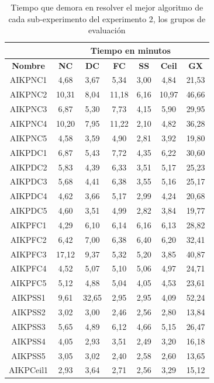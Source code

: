 \begin{table}[hbtp!]
\caption{Tiempo que demora en resolver el mejor algoritmo de cada sub-experimento del experimento 2, los grupos de evaluación}\label{tab:evol_vs_eval_tiempos_exp2}
\small
\centering
\begin{center}
\begin{tabular}{c|cccccc}
{\textbf{}} & \multicolumn{6}{c}{{\textbf{Tiempo en minutos}}} \\ \hline
{\textbf{Nombre}} & {\textbf{NC}} & {\textbf{DC}} & {\textbf{FC}} & {\textbf{SS}} & {\textbf{Ceil}} & {\textbf{GX}} \\ \hline
AIKPNC1 & 4,68 & 3,67 & 5,34 & 3,00 & 4,84 & 21,53 \\
AIKPNC2 & 10,31 & 8,04 & 11,18 & 6,16 & 10,97 & 46,66 \\
AIKPNC3 & 6,87 & 5,30 & 7,73 & 4,15 & 5,90 & 29,95 \\
AIKPNC4 & 10,20 & 7,95 & 11,22 & 2,10 & 4,82 & 36,28 \\
AIKPNC5 & 4,58 & 3,59 & 4,90 & 2,81 & 3,92 & 19,80 \\
AIKPDC1 & 6,87 & 5,43 & 7,72 & 4,35 & 6,22 & 30,60 \\
AIKPDC2 & 5,83 & 4,39 & 6,33 & 3,51 & 5,17 & 25,23 \\
AIKPDC3 & 5,68 & 4,41 & 6,38 & 3,55 & 5,16 & 25,17 \\
AIKPDC4 & 4,62 & 3,66 & 5,17 & 2,99 & 4,24 & 20,68 \\
AIKPDC5 & 4,60 & 3,51 & 4,99 & 2,82 & 3,84 & 19,77 \\
AIKPFC1 & 4,29 & 6,10 & 6,14 & 6,16 & 6,13 & 28,82 \\
AIKPFC2 & 6,42 & 7,00 & 6,38 & 6,40 & 6,20 & 32,41 \\
AIKPFC3 & 17,12 & 9,37 & 5,32 & 5,20 & 3,85 & 40,87 \\
AIKPFC4 & 4,52 & 5,07 & 5,10 & 5,06 & 4,97 & 24,71 \\
AIKPFC5 & 5,12 & 4,88 & 5,04 & 4,05 & 4,53 & 23,61 \\
AIKPSS1 & 9,61 & 32,65 & 2,95 & 2,95 & 4,09 & 52,24 \\
AIKPSS2 & 3,02 & 3,00 & 2,46 & 2,56 & 2,80 & 13,84 \\
AIKPSS3 & 5,65 & 4,89 & 6,12 & 4,66 & 5,15 & 26,47 \\
AIKPSS4 & 4,05 & 2,93 & 3,51 & 2,49 & 3,20 & 16,18 \\
AIKPSS5 & 3,05 & 3,02 & 2,40 & 2,58 & 2,60 & 13,65 \\
AIKPCeil1 & 2,93 & 3,64 & 2,71 & 2,56 & 3,29 & 15,12 \\

\end{tabular}
\end{center}
\end{table}
